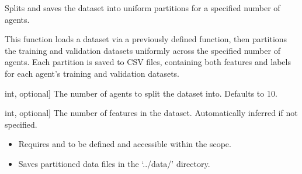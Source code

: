 \documentclass[letterpaper,10pt,english]{sphinxmanual}
\begin{document}
\begin{fulllineitems}
\label{\detokenize{utils:utils.uniform_partitions}}
\pysigstartsignatures
{}
\pysigstopsignatures
\sphinxAtStartPar
Splits and saves the dataset into uniform partitions for a specified number of agents.

\sphinxAtStartPar
This function loads a dataset via a previously defined  function, then partitions
the training and validation datasets uniformly across the specified number of agents. Each partition
is saved to CSV files, containing both features and labels for each agent’s training and validation datasets.
\begin{description}
\begin{description}
\sphinxlineitem{agents}{[}int, optional{]}
\sphinxAtStartPar
The number of agents to split the dataset into. Defaults to 10.

\sphinxlineitem{num\_features}{[}int, optional{]}
\sphinxAtStartPar
The number of features in the dataset. Automatically inferred if not specified.

\end{description}

\begin{itemize}
\item {} 
\sphinxAtStartPar
Requires  and  to be defined and accessible within the scope.

\item {} 
\sphinxAtStartPar
Saves partitioned data files in the ‘../data/’ directory.

\end{itemize}

\begin{sphinxVerbatim}[commandchars=\\\{\}]
\end{sphinxVerbatim}


\end{description}
\end{fulllineitems}
\end{document}
